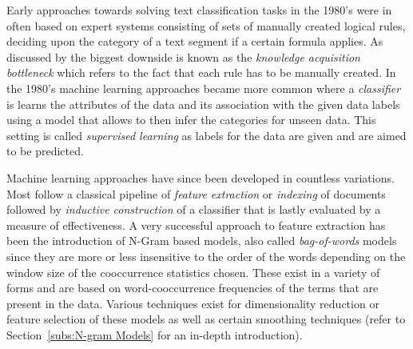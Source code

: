 Early approaches towards solving text classification tasks in the 1980's were in often based on expert systems consisting of sets of manually created logical rules, deciding upon the category of a text segment if a certain formula applies. As discussed by \cite{Sebastiani:2002aa} the biggest downside is known as the \emph{knowledge acquisition bottleneck} which refers to the fact that each rule has to be manually created. In the 1980's machine learning approaches became more common where a \emph{classifier} is learns the attributes of the data and its association with the given data labels using a model that allows to then infer the categories for unseen data. This setting is called \emph{supervised learning} as labels for the data are given and are aimed to be predicted.

Machine learning approaches have since been developed in countless variations. Most follow a classical pipeline of \emph{feature extraction} or \emph{indexing} of documents followed by \emph{inductive construction} of a classifier that is lastly evaluated by a measure of effectiveness. A very successful approach to feature extraction has been the introduction of N-Gram based models, also called \emph{bag-of-words} models since they are more or less insensitive to the order of the words depending on the window size of the cooccurrence statistics chosen. These exist in a variety of forms and are based on word-cooccurrence frequencies of the terms that are present in the data. Various techniques exist for dimensionality reduction or feature selection of these models as well as certain smoothing techniques (refer to Section~\ref{subs:N-gram Models} for an in-depth introduction).


